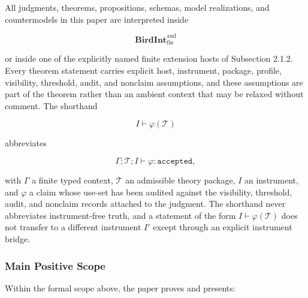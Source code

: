 \documentclass[11pt]{article}
\theoremstyle{definition}
\begin{document}
All judgments, theorems, propositions, schemas, model realizations, and countermodels in this paper are interpreted inside

\[
\mathbf{BirdInt}^{\mathrm{aud}}_{\mathrm{fin}}
\]

or inside one of the explicitly named finite extension hosts of Subsection 2.1.2. Every theorem statement carries explicit host, instrument, package, profile, visibility, threshold, audit, and nonclaim assumptions, and these assumptions are part of the theorem rather than an ambient context that may be relaxed without comment. The shorthand

\[
I\vdash\varphi(\mathcal T)
\]

abbreviates

\[
\Gamma;\mathcal T;I\vdash\varphi:\texttt{accepted},
\]

with \(\Gamma\) a finite typed context, \(\mathcal T\) an admissible theory package, \(I\) an instrument, and \(\varphi\) a claim whose use-set has been audited against the visibility, threshold, audit, and nonclaim records attached to the judgment. The shorthand never abbreviates instrument-free truth, and a statement of the form \(I\vdash\varphi(\mathcal T)\) does not transfer to a different instrument \(I'\) except through an explicit instrument bridge.

\subsubsection{Main Positive Scope}

Within the formal scope above, the paper proves and presents:
\end{document}
